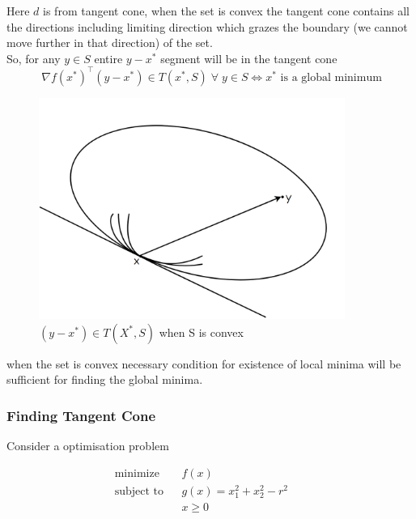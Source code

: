 \documentclass[twoside]{article}
\DeclareMathOperator{\minimize}{minimize}
\DeclareMathOperator{\subjectto}{subject\ to}
\begin{document}
Here \(d\) is from tangent cone, when the set is convex the tangent cone contains all the directions including limiting direction which grazes the boundary (we cannot move further in that direction) of the set.\\
So, for any $y \in S$ entire $ y-x^*$ segment will be in the tangent cone \\

$$\:\nabla f(x^{*})^\top(y-x^{*}) \in T(x^{*},S)  \; \forall \;y\in S \iff x^* \text{ is a global minimum}$$

\begin{figure}[h]
\center
\includegraphics[width=10cm]{images/pic3.png}
\caption{$(y-x^*) \in T(X^*, S)$ when S is convex}
\end{figure}

when the set is convex necessary condition for existence of local minima will be sufficient for finding the global minima.\\

\subsubsection{Finding Tangent Cone}

Consider a optimisation problem 

\begin{equation}
\begin{aligned}
& \minimize && f(x) &&&\\
& \subjectto && g(x) = x^{2}_{1}+x^{2}_2-r^{2}\\
&&& x \geq 0
\end{aligned}
\end{equation}
\end{document}
